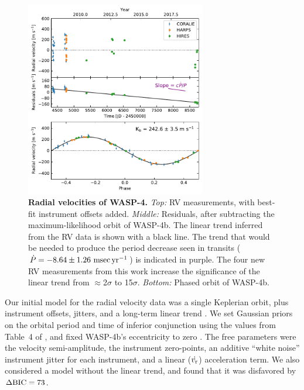 \documentclass[12pt,twocolumn,tighten]{aastex62}
\begin{document}
\begin{figure}[t]
	\begin{center}
		\leavevmode
		\includegraphics[width=0.7\textwidth]{f2.pdf}
	\end{center}
	\vspace{-0.7cm}
	\caption{
    {\bf Radial velocities of WASP-4.}
    {\it Top:} RV measurements, with best-fit instrument offsets
    added. 
    {\it Middle:}
    Residuals, after subtracting the
    maximum-likelihood orbit of WASP-4b.  The linear trend
    inferred from the RV data is shown with a black line.
    The trend that would be needed to
    produce the period decrease seen in transits ($\dot{P}= - 8.64 \pm
    1.26~{\rm msec}\,{\rm yr}^{-1}$) is indicated in purple.  The four
    new RV measurements from this work increase the
    significance of the linear trend from $\approx$2$\sigma$
    to 15$\sigma$.
    {\it Bottom:}
    Phased orbit of WASP-4b.
	\label{fig:rvs}
  \vspace{-0.3cm}
	}
\end{figure}

Our initial model for the radial velocity data was a single Keplerian
orbit, plus instrument offsets, jitters, and a long-term linear trend
\citep[][\texttt{radvel}]{fulton_radvel_2018}.  We set Gaussian priors
on the orbital period and time of inferior conjunction using the
values from Table~4 of , and fixed
WASP-4b's eccentricity to zero
\citep{beerer_secondary_2011,knutson_friends_2014,bonomo_gaps_2017}.
The free parameters were the velocity semi-amplitude, the instrument
zero-points, an additive ``white noise'' instrument jitter for each
instrument, and a linear ($\dot{v_{\rm r}}$) acceleration term.  We
also considered a model without the linear trend, and found that it
was disfavored by $\Delta {\rm BIC}=73$.
\end{document}

